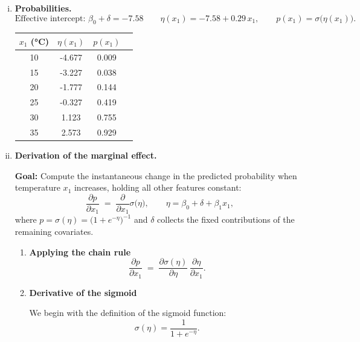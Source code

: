 {\begin{enumerate}[a)]
\begin{enumerate}[(i)]
        \item\textbf{Probabilities.}        
        \[
        \text{Effective intercept: } \beta_0+\delta=-7.58
        \qquad
        \eta(x_1)=-7.58 + 0.29\,x_1,
        \qquad
        p(x_1)=\sigma\!\bigl(\eta(x_1)\bigr).
        \]
        
        \begin{center}
        \begin{tabular}{cccc}
        \toprule
        \(x_1\) (\si{\celsius}) & \(\eta(x_1)\) & \(p(x_1)\) \\
        \midrule
        10 &  -4.677 & 0.009 \\
        15 &  -3.227 & 0.038 \\
        20 &  -1.777 & 0.144 \\
        25 &  -0.327 & 0.419 \\
        30 &   1.123 & 0.755 \\
        35 &   2.573 & 0.929 \\
        \bottomrule
        \end{tabular}
        \end{center}
        
        \item\textbf{Derivation of the marginal effect.}
        
        \textbf{Goal:} Compute the instantaneous change in the predicted probability  
        when temperature \(x_{1}\) increases, holding all other features constant:
        \[
        \frac{\partial p}{\partial x_{1}}
           \;=\;
           \frac{\partial}{\partial x_{1}}
           \sigma\!\bigl(\eta\bigr),
           \qquad
           \eta=\beta_{0}+\delta+\beta_{1}x_{1},
        \]
        where \(p=\sigma(\eta)=\bigl(1+e^{-\eta}\bigr)^{-1}\) and  
        \(\delta\) collects the fixed contributions of the remaining covariates.
        
        \begin{enumerate}
            \item \textbf{Applying the chain rule}
            \[
            \frac{\partial p}{\partial x_{1}}
             \;=\;
             \frac{\partial \sigma(\eta)}{\partial \eta}\,
             \frac{\partial \eta}{\partial x_{1}} .
            \]
            
            \item \textbf{Derivative of the sigmoid}
            
            We begin with the definition of the sigmoid function:
            \[
            \sigma(\eta) = \frac{1}{1 + e^{-\eta}}.
            \]
            

\end{enumerate}
\end{enumerate}
\end{enumerate}}
